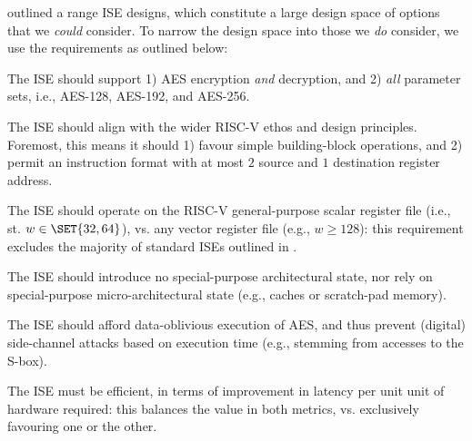 
outlined a range ISE designs, which constitute a large design space of
options that we {\em could} consider.  To narrow the design space into
those we {\em do} consider, we use the requirements as outlined below:

\begin{requirement}
The ISE should support
1) AES encryption {\em and} decryption,
   and
2) {\em all} parameter sets, i.e., AES-128, AES-192, and AES-256.
\end{requirement}

\begin{requirement}
The ISE should align with the wider RISC-V ethos and design principles.
Foremost, this means it should 
1) favour simple building-block operations,
   and
2) permit an instruction format with at most $2$ source and $1$ destination register address.
\end{requirement}

\begin{requirement}
The ISE should operate on 
the RISC-V general-purpose scalar register file 
(i.e., st. $w \in \SET{32,64}$),
vs. 
any                        vector register file
(e.g., $w \ge 128$):
this requirement excludes the majority of standard ISEs outlined in 
.
\end{requirement}

\begin{requirement}
The ISE should introduce no
special-purpose       architectural state, 
nor rely on
special-purpose micro-architectural state
(e.g., caches or scratch-pad memory).
\end{requirement}

\begin{requirement}
The ISE should afford data-oblivious execution of AES, and thus prevent 
(digital) side-channel attacks based on execution time 
(e.g., stemming from accesses to the S-box).
\end{requirement}


\begin{requirement}
The ISE must be efficient, in terms of improvement in latency per unit
unit of hardware required: this balances the value in both metrics, vs.
exclusively favouring one or the other.
\end{requirement}


